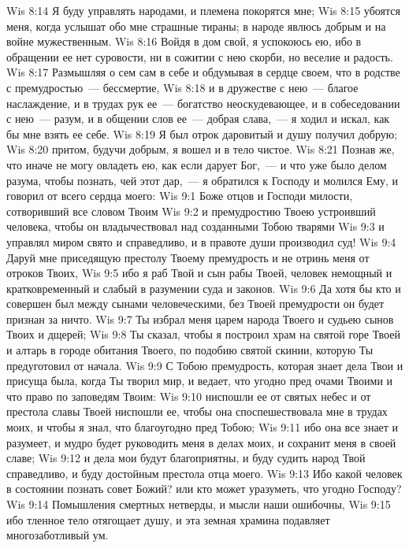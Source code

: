 \vs Wis 8:14 Я буду управлять народами, и племена покорятся мне;
\vs Wis 8:15 убоятся меня, когда услышат обо мне страшные тираны; в народе явлюсь добрым и на войне мужественным.
\vs Wis 8:16 Войдя в дом свой, я успокоюсь ею, ибо в обращении ее нет суровости, ни в сожитии с нею скорби, но веселие и радость.
\vs Wis 8:17 Размышляя о сем сам в себе и обдумывая в сердце своем, что в родстве с премудростью~--- бессмертие,
\vs Wis 8:18 и в дружестве с нею~--- благое наслаждение, и в трудах рук ее~--- богатство неоскудевающее, и в собеседовании с нею~--- разум, и в общении слов ее~--- добрая слава,~--- я ходил и искал, как бы мне взять ее себе.
\vs Wis 8:19 Я был отрок даровитый и душу получил добрую;
\vs Wis 8:20 притом, будучи добрым, я вошел и в тело чистое.
\vs Wis 8:21 Познав же, что иначе не могу овладеть ею, как если дарует Бог,~--- и что уже было делом разума, чтобы познать, чей этот дар,~--- я обратился к Господу и молился Ему, и говорил от всего сердца моего:
\vs Wis 9:1 Боже отцов и Господи милости, сотворивший все словом Твоим
\vs Wis 9:2 и премудростию Твоею устроивший человека, чтобы он владычествовал над созданными Тобою тварями
\vs Wis 9:3 и управлял миром свято и справедливо, и в правоте души производил суд!
\vs Wis 9:4 Даруй мне приседящую престолу Твоему премудрость и не отринь меня от отроков Твоих,
\vs Wis 9:5 ибо я раб Твой и сын рабы Твоей, человек немощный и кратковременный и слабый в разумении суда и законов.
\vs Wis 9:6 Да хотя бы кто и совершен был между сынами человеческими, без Твоей премудрости он будет признан за ничто.
\vs Wis 9:7 Ты избрал меня царем народа Твоего и судьею сынов Твоих и дщерей;
\vs Wis 9:8 Ты сказал, чтобы я построил храм на святой горе Твоей и алтарь в городе обитания Твоего, по подобию святой скинии, которую Ты предуготовил от начала.
\vs Wis 9:9 С Тобою премудрость, которая знает дела Твои и присуща была, когда Ты творил мир, и ведает, что угодно пред очами Твоими и что право по заповедям Твоим:
\vs Wis 9:10 ниспошли ее от святых небес и от престола славы Твоей ниспошли ее, чтобы она споспешествовала мне в трудах моих, и чтобы я знал, что благоугодно пред Тобою;
\vs Wis 9:11 ибо она все знает и разумеет, и мудро будет руководить меня в делах моих, и сохранит меня в своей славе;
\vs Wis 9:12 и дела мои будут благоприятны, и буду судить народ Твой справедливо, и буду достойным престола отца моего.
\vs Wis 9:13 Ибо какой человек в состоянии познать совет Божий? или кто может уразуметь, что угодно Господу?
\vs Wis 9:14 Помышления смертных нетверды, и мысли наши ошибочны,
\vs Wis 9:15 ибо тленное тело отягощает душу, и эта земная храмина подавляет многозаботливый ум.
